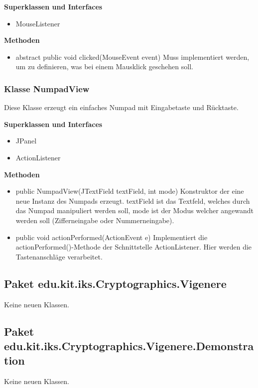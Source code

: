 \documentclass{article}
\begin{document}
    \textbf{Superklassen und Interfaces}
      \begin{itemize}
        \item MouseListener
      \end{itemize}
           
    \textbf{Methoden}
      \begin{itemize}
        \item abstract public void clicked(MouseEvent event)\newline
        	Muss implementiert werden, um zu definieren, was bei einem Mausklick geschehen soll.
      \end{itemize}
      
    \subsubsection{Klasse NumpadView}
    Diese Klasse erzeugt ein einfaches Numpad mit Eingabetaste und Rücktaste.
    
    \textbf{Superklassen und Interfaces}
      \begin{itemize}
        \item JPanel
        \item ActionListener
      \end{itemize}

    \textbf{Methoden}
      \begin{itemize}
        \item public NumpadView(JTextField textField, int mode)\newline
        	Konstruktor der eine neue Instanz des Numpads erzeugt. textField ist das Textfeld,
        	welches durch das Numpad manipuliert werden soll, mode ist der Modus welcher angewandt
        	werden soll (Zifferneingabe oder Nummerneingabe).
        \item public void actionPerformed(ActionEvent e)\newline
        	Implementiert die actionPerformed()-Methode der Schnittstelle ActionListener. Hier
        	werden die Tastenanschläge verarbeitet.
      \end{itemize}

  \subsection{Paket edu.kit.iks.Cryptographics.Vigenere}
	Keine neuen Klassen.
  \subsection{Paket edu.kit.iks.Cryptographics.Vigenere.Demonstration}
	Keine neuen Klassen.
\end{document}
